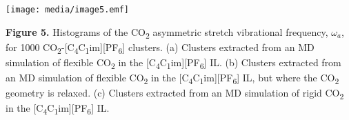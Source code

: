 \documentclass[]{article}
\begin{document}
\texttt{[image: media/image5.emf]}

\textbf{Figure 5.} Histograms of the CO\textsubscript{2} asymmetric
stretch vibrational frequency, \(\omega_{a}\), for 1000
CO\textsubscript{2}-{[}C\textsubscript{4}C\textsubscript{1}im{]}{[}PF\textsubscript{6}{]}
clusters. (a) Clusters extracted from an MD simulation of flexible
CO\textsubscript{2} in the
{[}C\textsubscript{4}C\textsubscript{1}im{]}{[}PF\textsubscript{6}{]}
IL. (b) Clusters extracted from an MD simulation of flexible
CO\textsubscript{2} in the
{[}C\textsubscript{4}C\textsubscript{1}im{]}{[}PF\textsubscript{6}{]}
IL, but where the CO\textsubscript{2} geometry is relaxed. (c) Clusters
extracted from an MD simulation of rigid CO\textsubscript{2} in the
{[}C\textsubscript{4}C\textsubscript{1}im{]}{[}PF\textsubscript{6}{]}
IL.
\end{document}
